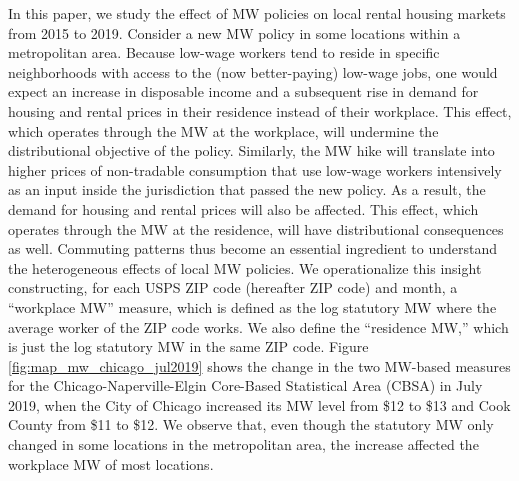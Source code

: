 In this paper, we study the effect of MW policies on local rental housing 
markets from 2015 to 2019.
Consider a new MW policy in some locations within a metropolitan area.
Because low-wage workers tend to reside in specific neighborhoods with access 
to the (now better-paying) low-wage jobs,
one would expect an increase in disposable income and a subsequent rise in demand 
for housing and rental prices in their residence instead of their workplace.
This effect, which operates through the MW at the workplace, 
will undermine the distributional objective of the policy.
Similarly, the MW hike will translate into higher prices of non-tradable 
consumption that use low-wage workers intensively as an input inside the 
jurisdiction that passed the new policy.
As a result, the demand for housing and rental prices will also be affected.
This effect, which operates through the MW at the residence, will have 
distributional consequences as well.
Commuting patterns thus become an essential ingredient to understand the 
heterogeneous effects of local MW policies.
We operationalize this insight constructing, for each USPS ZIP code (hereafter 
ZIP code) and month,
a ``workplace MW'' measure, which is defined as the log statutory MW where
the average worker of the ZIP code works.
We also define the ``residence MW,'' which is just the log statutory MW in the
same ZIP code.
Figure \ref{fig:map_mw_chicago_jul2019} shows the change in the two MW-based 
measures for the Chicago-Naperville-Elgin Core-Based Statistical Area (CBSA) in 
July 2019, when the City of Chicago increased its MW level from \$12 to \$13 and 
Cook County from \$11 to \$12.
We observe that, even though the statutory MW only changed in some locations in
the metropolitan area, the increase affected the workplace MW of most locations.


